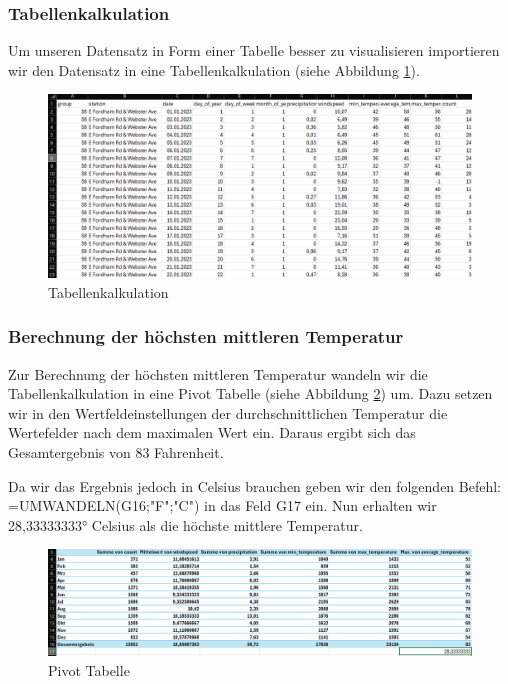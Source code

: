 \documentclass{article}
\begin{document}
\subsubsection{Tabellenkalkulation}

Um unseren Datensatz in Form einer Tabelle besser zu visualisieren importieren wir den Datensatz in eine Tabellenkalkulation (siehe Abbildung \ref{fig:Abb1}).
\begin{figure}[ht]
\centering
\includegraphics[width = \textwidth]{Abbildung_1.png}
\caption{Tabellenkalkulation}
\label{fig:Abb1}
\end{figure}
\newpage
\subsubsection{Berechnung der höchsten mittleren Temperatur}

Zur Berechnung der höchsten mittleren Temperatur wandeln wir die Tabellenkalkulation in eine Pivot Tabelle (siehe Abbildung \ref{fig:Abb2}) um. Dazu setzen wir in den Wertfeldeinstellungen der durchschnittlichen Temperatur die Wertefelder nach dem maximalen Wert ein. Daraus ergibt sich das Gesamtergebnis von 83 Fahrenheit.


Da wir das Ergebnis jedoch in Celsius brauchen geben wir den folgenden Befehl: =UMWANDELN(G16;"F";"C") in das Feld G17 ein. Nun erhalten wir \ang{28,33333333} Celsius als die höchste mittlere Temperatur.
\begin{figure}[ht]
\centering
\includegraphics[width = \textwidth]{Abbildung_2.png}
\caption{Pivot Tabelle}
\label{fig:Abb2}
\end{figure}
\end{document}
